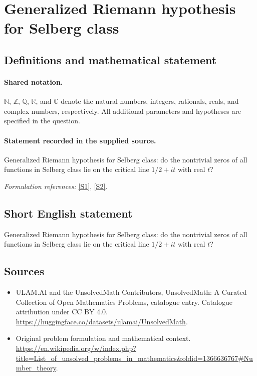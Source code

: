 \documentclass[11pt]{article}
\newcommand{\sref}[2]{\hyperlink{source:#1:#2}{[S#2]}}
\begin{document}
\section{Generalized Riemann hypothesis for Selberg class}\label{statement}

\subsection{Definitions and mathematical statement}

\paragraph{Shared notation.}$\mathbb N$, $\mathbb Z$, $\mathbb Q$, $\mathbb R$, and $\mathbb C$ denote the natural numbers, integers, rationals, reals, and complex numbers, respectively. All additional parameters and hypotheses are specified in the question.


\paragraph{Statement recorded in the supplied source.}
Generalized Riemann hypothesis for Selberg class: do the nontrivial zeros of all functions in Selberg class lie on the critical line $1/2 + it$ with real $t$?
\par\smallskip\textit{Formulation references:} \sref{statement}{1}, \sref{statement}{2}.
\subsection{Short English statement}
Generalized Riemann hypothesis for Selberg class: do the nontrivial zeros of all functions in Selberg class lie on the critical line $1/2 + it$ with real $t$?
\subsection{Sources}
\begin{itemize}
\item[\hypertarget{source:statement:1}{S1}] ULAM.AI and the UnsolvedMath Contributors, UnsolvedMath: A Curated Collection of Open Mathematics Problems, catalogue entry. Catalogue attribution under CC BY 4.0.
\url{https://huggingface.co/datasets/ulamai/UnsolvedMath}.
\item[\hypertarget{source:statement:2}{S2}] Original problem formulation and mathematical context.
\url{https://en.wikipedia.org/w/index.php?title=List_of_unsolved_problems_in_mathematics&oldid=1366636767#Number_theory}.
\end{itemize}
\label{end:statement}
\end{document}
